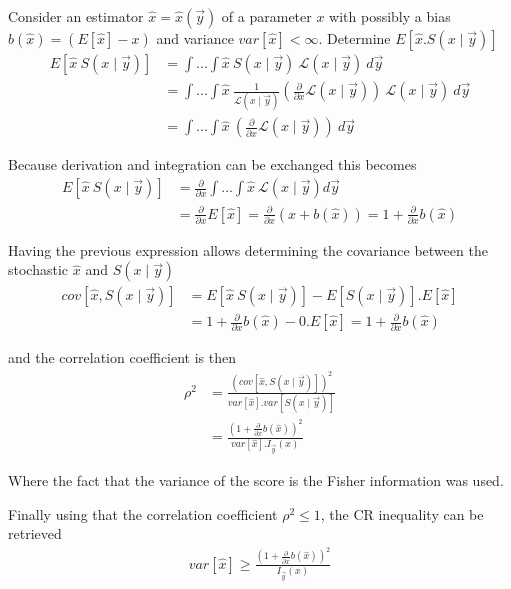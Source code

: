 \documentclass[report,12pt]{report}
\begin{document}
{
Consider an estimator $\hat x = \hat x(\vec y)$ of a parameter $x$ with possibly a bias $b(\hat x) = (E[\hat x] - x)$ and variance $var[\hat x] < \infty$. Determine $E\left[ \hat x . S(x \mid \vec y)\right]$
\begin{align}
	E\left[ \hat x \ S(x \mid \vec y)\right] &=
	\int ... \int \hat x \ S(x \mid \vec y)\ 
	\mathcal{L}(x \mid \vec y)\ d\vec y
	\nonumber\\
	&= \int ... \int \hat x\ \frac{1}{\mathcal{L}(x \mid \vec y)}
	\left( \frac{\partial}{\partial x} \mathcal{L}(x \mid \vec y)
	\right) \ \mathcal{L}(x \mid \vec y)\ d\vec y
	\nonumber\\
	&= \int ... \int \hat x\
	\left( \frac{\partial}{\partial x} \mathcal{L}(x \mid \vec y)
	\right) \ d\vec y
\end{align}

Because derivation and integration can be exchanged this becomes
\begin{align}
	E\left[ \hat x\ S(x \mid \vec y)\right] &= \frac{\partial}{\partial x} \int ... \int \hat x\ \mathcal{L} 
	(x \mid \vec y ) d\vec y
	\nonumber\\
	&= \frac{\partial}{\partial x} E[\hat x]
	= \frac{\partial}{\partial x}\left(x + b(\hat x)\right)
	= 1 + \frac{\partial}{\partial x}b(\hat x)
\end{align}

Having the previous expression allows determining the covariance between the stochastic $\hat x$ and $S(x \mid \vec y)$
\begin{align}
	cov[\hat x, S(x \mid \vec y)] &=
	E\left[ \hat x\ S(x \mid \vec y)\right] 
	- E\left[ S(x \mid \vec y)\right].E\left[ \hat x \right]
	\nonumber\\
	&= 1 + \frac{\partial}{\partial x}b(\hat x) - 
	0.E\left[ \hat x \right]
	=	1 + \frac{\partial}{\partial x}b(\hat x)
\end{align}

and the correlation coefficient is then
\begin{align}
	\rho^2 &= \frac{
	\left( cov[\hat x, S(x \mid \vec y)] \right)^2}
	{var\left[\hat x\right].var\left[S(x \mid \vec y)\right]}
	\nonumber\\
	&= \frac
	{\left(1 + \frac{\partial}{\partial x}b(\hat x)\right)^2}
	{var[\hat x].I_{\vec y}(x)}
\end{align}

Where the fact that the variance of the score is the Fisher information was used.

Finally using that the correlation coefficient $\rho^2 \leq 1$, the CR inequality can be retrieved
\begin{align}
	var[\hat x] \geq \frac
	{\left(1 + \frac{\partial}{\partial x}b(\hat x)\right)^2}
	{I_{\vec y}(x)}
\end{align}
}\hfill
\end{document}
